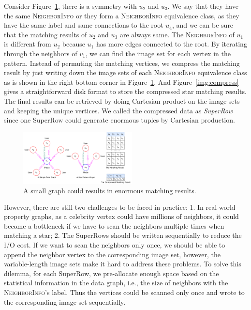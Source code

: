 Consider Figure~\ref{img:compress_example}, there is a symmetry with $u_2$ and $u_3$.
We say that they have the same \textsc{NeighborInfo} or they form a \textsc{NeighborInfo} equivalence class, as they have the same label and same connections to the root $u_4$,
and we can be sure that the matching results of $u_2$ and $u_3$ are always same.
The \textsc{NeighborInfo} of $u_1$ is different from $u_2$ because $u_1$ has more edges connected to the root.
By iterating through the neighbors of $v_1$, we can find the image set for each vertex in the pattern.
Instead of permuting the matching vertices, we compress the matching result by just writing down the image sets of each \textsc{NeighborInfo} equivalence class as is shown in the right bottom corner in Figure~\ref{img:compress_example}.
And Figure~\ref{img:compress} gives a straightforward disk format to store the compressed star matching results.
The final results can be retrieved by doing Cartesian product on the image sets and keeping the unique vertices.
We called the compressed data as \emph{SuperRow} since one SuperRow could generate enormous tuples by Cartesian production.
\begin{figure}[ht]
  \centering
  \includegraphics[width=0.53\textwidth]{img/compress_example.pdf}
  \caption{A small graph could results in enormous matching results.}\label{img:compress_example}
\end{figure}

However, there are still two challenges to be faced in practice:
1. In real-world property graphs, as a celebrity vertex could have millions of neighbors, it could become a bottleneck if we have to scan the neighbors multiple times when matching a star;
2. The SuperRows should be written sequentially to reduce the I/O cost.
If we want to scan the neighbors only once, we should be able to append the neighbor vertex to the corresponding image set, however, the variable-length image sets make it hard to address these problems.
To solve this dilemma, for each SuperRow, we pre-allocate enough space based on the statistical information in the data graph, i.e., the size of neighbors with the \textsc{NeighborInfo}'s label.
Thus the vertices could be scanned only once and wrote to the corresponding image set sequentially.
